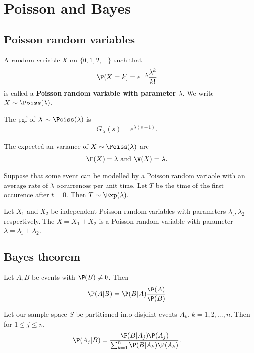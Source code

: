 \documentclass{article}
\begin{document}
\section{Poisson and Bayes}
\subsection{Poisson random variables}
\begin{definition}
    A random variable $X$ on $\{0,1,2,...\}$ such that
    \begin{align*}
        \P(X=k) = e^{-\lambda}\frac{\lambda^k}{k!}
    \end{align*}
    is called a \textbf{Poisson random variable with parameter $\lambda$}.
    We write $X\sim\Poiss(\lambda)$.
\end{definition}
\begin{lemma}
    The pgf of $X\sim\Poiss(\lambda)$ is
    \begin{align*}
        G_X(s) = e^{\lambda(s-1)}.
    \end{align*}
\end{lemma}
\begin{lemma}
    The expected an variance of $X\sim\Poiss(\lambda)$ are
    \begin{align*}
        \E(X) = \lambda \text{ and } \V(X) = \lambda.
    \end{align*}
\end{lemma}
\begin{theorem}
    Suppose that some event can be modelled by a Poisson random variable
    with an average rate of $\lambda$ occurrences per unit time. Let $T$
    be the time of the first occurence after $t=0$. Then $T\sim\Exp(\lambda)$.
\end{theorem}
\begin{theorem}
    Let $X_1$ and $X_2$ be independent Poisson random variables with parameters
    $\lambda_1, \lambda_2$ respectively. The $X=X_1 + X_2$ is a Poisson random
    variable with parameter $\lambda=\lambda_1+\lambda_2$.
\end{theorem}
\subsection{Bayes theorem}
\begin{theorem}
    Let $A,B$ be events with $\P(B)\not=0$. Then
    \begin{align*}
        \P(A|B)=\P(B|A)\frac{\P(A)}{\P(B)}
    \end{align*}
\end{theorem}
\begin{theorem}
    Let our sample space $S$ be partitioned into disjoint events $A_k$,
    $k=1,2,...,n$. Then for $1\leq j\leq n$,
    \begin{align*}
        \P(A_j|B)=\frac{\P(B|A_j)\P(A_j)}{\sum_{k=1}^n \P(B|A_k)\P(A_k)}.
    \end{align*}
\end{theorem}
\end{document}
